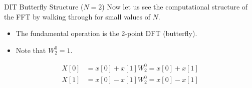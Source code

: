 \begin{frame}{DIT Butterfly Structure ($N=2$)}
    Now let us see the computational structure of the FFT by walking through for small values of $N$.

    \vspace{1cm}
    \begin{minipage}{0.48\textwidth}
        \begin{itemize}
            \item The fundamental operation is the 2-point DFT (butterfly).
            \item Note that $W_2^0 = 1$.
        \end{itemize}
        \vspace{0.4cm}
        \begin{align*}
            X[0] & = x[0] + x[1]W_2^0 = x[0] + x[1] \\
            X[1] & = x[0] - x[1]W_2^0 = x[0] - x[1]
        \end{align*}
    \end{minipage}
    \hfill
    \begin{minipage}{0.48\textwidth}
        \begin{center}
        \end{center}
    \end{minipage}
\end{frame}

